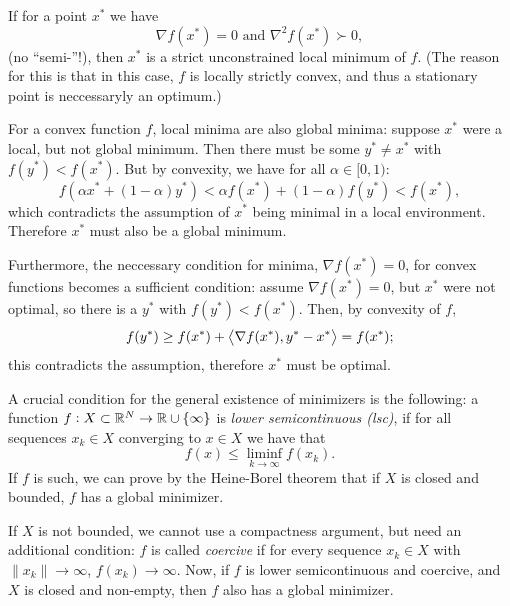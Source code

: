 \documentclass{article}
\begin{document}
\label{s:sufficient-optimality}

If for a point \(x^*\) we have
\begin{equation*}
  \nabla f(x^*) = 0 \text{ and } \nabla^2 f(x^*) \succ 0,
\end{equation*}
(no ``semi-''!), then \(x^*\) is a strict unconstrained local minimum of \(f\).  (The reason for
this is that in this case, \(f\) is locally strictly convex, and thus a stationary point is
neccessaryly an optimum.)


\label{s:convex-minima}

For a convex function \(f\), local minima are also global minima: suppose \(x^*\) were a local, but
not global minimum.  Then there must be some \(y^* \neq x^*\) with \(f(y^*) < f(x^*)\).  But by
convexity, we have for all \(\alpha \in [0, 1)\):
\begin{equation*}
  f(\alpha x^* + (1 - \alpha) y^*) < \alpha f(x^*) + (1 - \alpha) f(y^*) < f(x^*),
\end{equation*}
which contradicts the assumption of \(x^*\) being minimal in a local environment. Therefore \(x^*\)
must also be a global minimum.

Furthermore, the neccessary condition for minima, \(\nabla f(x^*) = 0\), for convex functions
becomes a sufficient condition: assume \(\nabla f(x^*) = 0\), but \(x^*\) were not optimal, so there
is a \(y^*\) with \(f(y^*) < f(x^*)\).  Then, by convexity of \(f\),
\begin{equation*}
  f(y^*) \geq f(x^*) + \left\langle \nabla f(x^*), y^* - x^* \right\rangle = f(x^*);
\end{equation*}
this contradicts the assumption, therefore \(x^*\) must be optimal.

\label{s:minimizers-existence}

A crucial condition for the general existence of minimizers is the following: a function
\(f: X \subset \mathbb{R}^N \to \mathbb{R} \cup \{\infty\}\) is \emph{lower semicontinuous (lsc)}, if for all
sequences \({x_k} \in X\) converging to \(x \in X\) we have that
\begin{equation*}
  f(x) \leq \liminf_{k \to \infty} f(x_k).
\end{equation*}
If \(f\) is such, we can prove by the Heine-Borel theorem that if \(X\) is closed and bounded, \(f\)
has a global minimizer.

If \(X\) is not bounded, we cannot use a compactness argument, but need an additional condition:
\(f\) is called \emph{coercive} if for every sequence \({x_k} \in X\) with \(\lVert x_k \rVert \to
\infty\), \(f(x_k) \to \infty\).  Now, if \(f\) is lower semicontinuous and coercive, and \(X\) is
closed and non-empty, then \(f\) also has a global minimizer.
\end{document}
